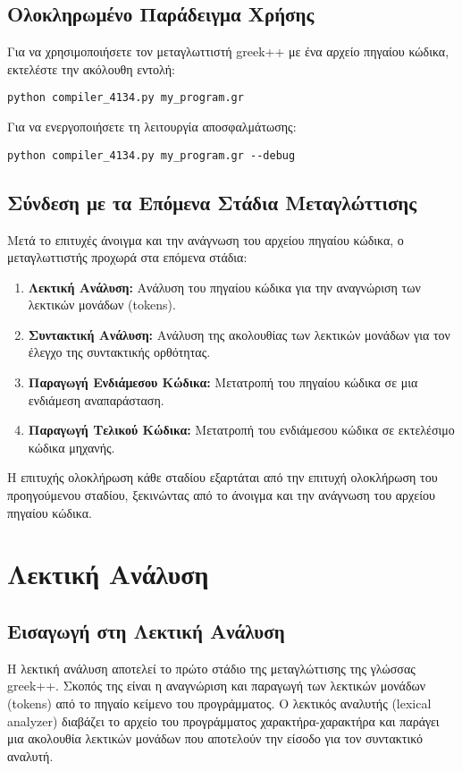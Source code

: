 \documentclass[12pt,a4paper]{article}
\begin{document}
\subsection{Ολοκληρωμένο Παράδειγμα Χρήσης}

Για να χρησιμοποιήσετε τον μεταγλωττιστή greek++ με ένα αρχείο πηγαίου κώδικα, εκτελέστε την ακόλουθη εντολή:

\begin{verbatim}
python compiler_4134.py my_program.gr
\end{verbatim}

Για να ενεργοποιήσετε τη λειτουργία αποσφαλμάτωσης:

\begin{verbatim}
python compiler_4134.py my_program.gr --debug
\end{verbatim}

\subsection{Σύνδεση με τα Επόμενα Στάδια Μεταγλώττισης}

Μετά το επιτυχές άνοιγμα και την ανάγνωση του αρχείου πηγαίου κώδικα, ο μεταγλωττιστής προχωρά στα επόμενα στάδια:

\begin{enumerate}
    \item \textbf{Λεκτική Ανάλυση:} Ανάλυση του πηγαίου κώδικα για την αναγνώριση των λεκτικών μονάδων (tokens).
    \item \textbf{Συντακτική Ανάλυση:} Ανάλυση της ακολουθίας των λεκτικών μονάδων για τον έλεγχο της συντακτικής ορθότητας.
    \item \textbf{Παραγωγή Ενδιάμεσου Κώδικα:} Μετατροπή του πηγαίου κώδικα σε μια ενδιάμεση αναπαράσταση.
    \item \textbf{Παραγωγή Τελικού Κώδικα:} Μετατροπή του ενδιάμεσου κώδικα σε εκτελέσιμο κώδικα μηχανής.
\end{enumerate}

Η επιτυχής ολοκλήρωση κάθε σταδίου εξαρτάται από την επιτυχή ολοκλήρωση του προηγούμενου σταδίου, ξεκινώντας από το άνοιγμα και την ανάγνωση του αρχείου πηγαίου κώδικα.

    \section{Λεκτική Ανάλυση}

        \subsection{Εισαγωγή στη Λεκτική Ανάλυση}
            Η λεκτική ανάλυση αποτελεί το πρώτο στάδιο της μεταγλώττισης της γλώσσας greek++. Σκοπός της είναι η αναγνώριση και παραγωγή των λεκτικών μονάδων (tokens) από το πηγαίο κείμενο του προγράμματος. Ο λεκτικός αναλυτής (lexical analyzer) διαβάζει το αρχείο του προγράμματος χαρακτήρα-χαρακτήρα και παράγει μια ακολουθία λεκτικών μονάδων που αποτελούν την είσοδο για τον συντακτικό αναλυτή.
\end{document}
